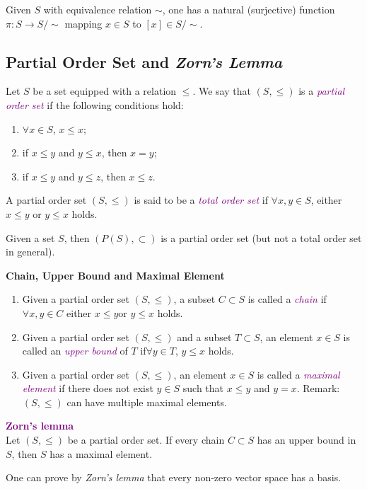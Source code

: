 Given $S$ with equivalence relation $\sim$, one has a natural (surjective) function $\pi: S \rightarrow S/ \sim$
mapping $x \in S$ to $[x] \in S/ \sim$.

\subsection{Partial Order Set and \textit{Zorn's Lemma}}

\begin{definition}
    Let $S$ be a set equipped with a relation $\leq$. We say that $(S, \leq)$ is a \textcolor{purple}{\textit{partial order set}} if
    the following conditions hold:
    \begin{enumerate}
        \item $\forall x \in S$, $x \leq x$;
        \item if $x \leq  y$ and $y \leq  x$, then $x = y$;
        \item if $x \leq  y$ and $y \leq  z$, then $x \leq z$.
    \end{enumerate}

\end{definition}

\begin{definition}
A partial order set $(S, \leq )$ is said to be a \textcolor{purple}{\textit{total order set}} if $\forall x, y \in S$, either $x \leq  y$ or
    $y \leq  x$ holds.
\end{definition}

\begin{example}
    Given a set $S$, then $(P(S), \subset )$ is a partial order set (but not a total order set in general).
\end{example}

\begin{definition}
    \textbf{Chain, Upper Bound and Maximal Element}\\
    \begin{enumerate}
        \item Given a partial order set $(S, \leq )$, a subset $C \subset  S$ is called a \textcolor{purple}{\textit{chain}} if $\forall x, y \in C$ either
        $x \leq  y $or $y \leq  x$ holds.
        
        \item Given a partial order set $(S, \leq )$ and a subset $T \subset  S$, an element $x \in S$ is called an \textcolor{purple}{\textit{upper
        bound}} of $T$ if$ \forall y \in T$, $y \leq  x$ holds.
        
        \item Given a partial order set $(S, \leq )$, an element $x \in S$ is called a \textcolor{purple}{\textit{maximal element}} if there
        does not exist $y \in S $ such that $x \leq  y$ and $y = x$. Remark: $(S, \leq )$ can have multiple
        maximal elements.
    \end{enumerate}
\end{definition}


\begin{lemma}
\textcolor{purple}{\textbf{Zorn’s lemma}}\\
 Let $(S, \leq )$ be a partial order set. If every chain $C \subset  S$ has an upper
bound in $S$, then $S$ has a maximal element.

One can prove by \textit{Zorn’s lemma} that every non-zero vector space has a basis.
\end{lemma}